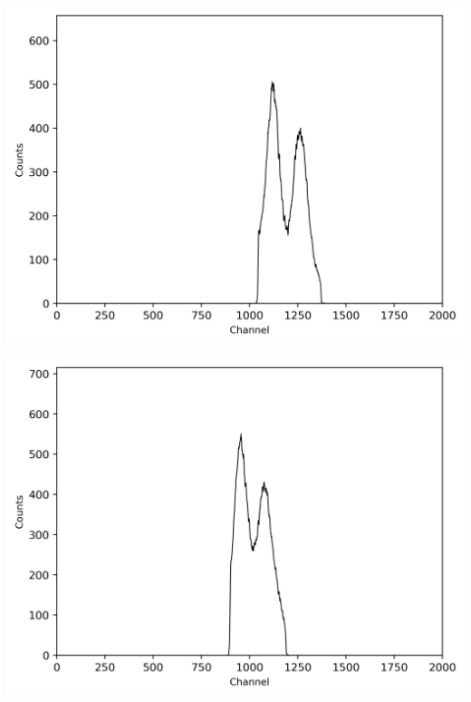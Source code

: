 \begin{multicols}{2}
\begin{center}
\begin{adjustbox}{max width=\linewidth, keepaspectratio}
        \end{adjustbox}
        \label{fig:comptonpeak}
    \end{center}
\endminipage
%
\vspace{10mm}
%
\minipage{\linewidth}
    \begin{center}
        \captionsetup{type=figure}
        \begin{adjustbox}{max width=\linewidth, keepaspectratio}
            \includegraphics[]{png/60CoEnergiewindow1}
        \end{adjustbox}
        \label{fig:60CoEnergiewindow1}
    \end{center}
\endminipage
%
\vspace{10mm}
%
\minipage{\linewidth}
    \begin{center}
        \captionsetup{type=figure}
        \begin{adjustbox}{max width=\linewidth, keepaspectratio}
            \includegraphics[]{png/60CoEnergiewindow2}

\end{adjustbox}
\end{center}
\end{multicols}
